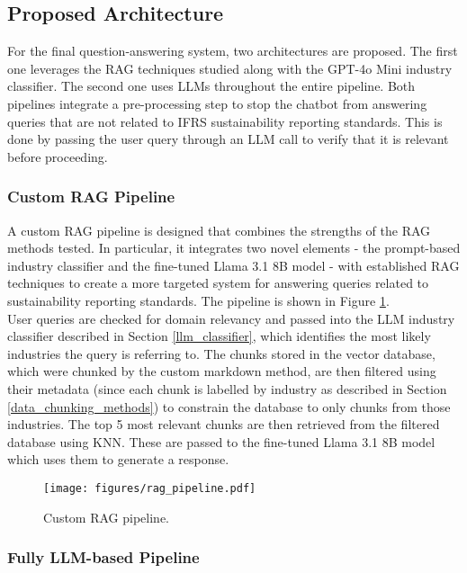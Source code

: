 \subsection{Proposed Architecture}

For the final question-answering system, two architectures are proposed. The first one leverages the RAG techniques studied along with the GPT-4o Mini industry classifier. The second one uses LLMs throughout the entire pipeline. Both pipelines integrate a pre-processing step to stop the chatbot from answering queries that are not related to IFRS sustainability reporting standards. This is done by passing the user query through an LLM call to verify that it is relevant before proceeding. 

\subsubsection{Custom RAG Pipeline}

A custom RAG pipeline is designed that combines the strengths of the RAG methods tested. In particular, it integrates two novel elements - the prompt-based industry classifier and the fine-tuned Llama 3.1 8B model - with established RAG techniques to create a more targeted system for answering queries related to sustainability reporting standards. The pipeline is shown in Figure \ref{fig:rag_pipeline}.\\

User queries are checked for domain relevancy and passed into the LLM industry classifier described in Section \ref{llm_classifier}, which identifies the most likely industries the query is referring to. The chunks stored in the vector database, which were chunked by the custom markdown method, are then filtered using their metadata (since each chunk is labelled by industry as described in Section \ref{data_chunking_methods}) to constrain the database to only chunks from those industries. The top 5 most relevant chunks are then retrieved from the filtered database using KNN. These are passed to the fine-tuned Llama 3.1 8B model which uses them to generate a response.

\begin{figure}
    \centering
    \texttt{[image: figures/rag\_pipeline.pdf]}
    \caption{Custom RAG pipeline.}
    \label{fig:rag_pipeline}
\end{figure}

\subsubsection{Fully LLM-based Pipeline}

